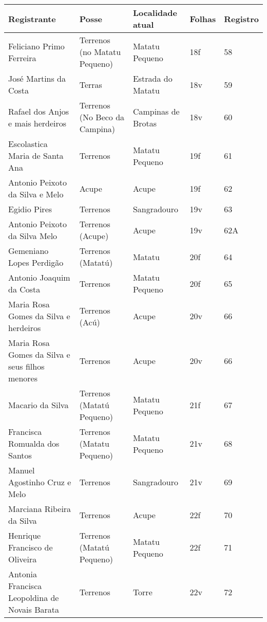 \begin{table}
{
\begin{minipage}{\textwidth}
\begin{tiny}
\begin{tabular}{p{4cm}p{4cm}p{4cm}ll}
\toprule
Registrante									&Posse					&Localidade atual	 		&Folhas			&Registro		\\
\midrule
\midrule
Feliciano Primo Ferreira							&Terrenos (no Matatu Pequeno)		&Matatu Pequeno				&18f			&58			\\
José Martins da Costa								&Terras					&Estrada do Matatu			&18v			&59			\\
Rafael dos Anjos e mais herdeiros						&Terrenos (No Beco da Campina)		&Campinas de Brotas			&18v			&60			\\
Escolastica Maria de Santa Ana							&Terrenos				&Matatu Pequeno				&19f			&61			\\
Antonio Peixoto da Silva e Melo							&Acupe					&Acupe					&19f			&62			\\
Egidio Pires									&Terrenos				&Sangradouro				&19v			&63			\\
Antonio Peixoto da Silva Melo							&Terrenos (Acupe)			&Acupe					&19v			&62A			\\
Gemeniano Lopes Perdigão							&Terrenos (Matatú)			&Matatu					&20f			&64			\\
Antonio Joaquim da Costa							&Terrenos				&Matatu Pequeno				&20f			&65			\\
Maria Rosa Gomes da Silva e herdeiros						&Terrenos (Acú)				&Acupe					&20v			&66			\\
Maria Rosa Gomes da Silva e seus filhos menores				&Terrenos				&Acupe					&20v			&66			\\
Macario da Silva								&Terrenos (Matatú Pequeno)		&Matatu Pequeno				&21f			&67			\\
Francisca Romualda dos Santos							&Terrenos (Matatu Pequeno)		&Matatu Pequeno				&21v			&68			\\
Manuel Agostinho Cruz e Melo							&Terrenos				&Sangradouro				&21v			&69			\\
Marciana Ribeira da Silva							&Terrenos				&Acupe					&22f			&70			\\
Henrique Francisco de Oliveira							&Terrenos (Matatú Pequeno)		&Matatu Pequeno				&22f			&71			\\
Antonia Francisca Leopoldina de Novais Barata					&Terrenos				&Torre					&22v			&72			\\

\end{tabular}
\end{tiny}
\end{minipage}}
\end{table}
